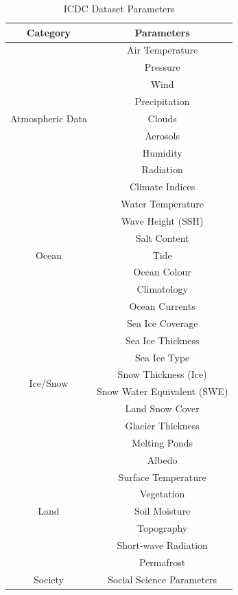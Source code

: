 \begin{table}[ht]
    \footnotesize
    \centering
    \begin{tabular}{|c|c|}
        \hline
        \textbf{Category} & \textbf{Parameters} \\
        \hline
        \multirow{9}{*}{Atmospheric Data} & Air Temperature \\
        & Pressure \\
        & Wind \\
        & Precipitation \\
        & Clouds \\
        & Aerosols \\
        & Humidity \\
        & Radiation \\
        & Climate Indices \\
        \hline
        \multirow{7}{*}{Ocean} & Water Temperature \\
        & Wave Height (SSH) \\
        & Salt Content \\
        & Tide \\
        & Ocean Colour \\
        & Climatology \\
        & Ocean Currents \\
        \hline
        \multirow{8}{*}{Ice/Snow} & Sea Ice Coverage \\
        & Sea Ice Thickness \\
        & Sea Ice Type \\
        & Snow Thickness (Ice) \\
        & Snow Water Equivalent (SWE) \\
        & Land Snow Cover \\
        & Glacier Thickness \\
        & Melting Ponds \\
        \hline
        \multirow{7}{*}{Land} & Albedo \\
        & Surface Temperature \\
        & Vegetation \\
        & Soil Moisture \\
        & Topography \\
        & Short-wave Radiation \\
        & Permafrost \\
        \hline
        \multirow{1}{*}{Society} & Social Science Parameters \\
        \hline
    \end{tabular}
    \caption{ICDC Dataset Parameters}
    \label{tab:icdc datset parameters}
\end{table}

